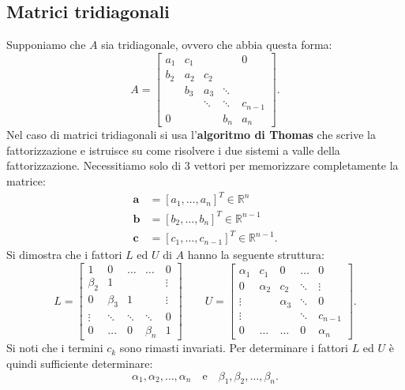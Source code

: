 \subsection{Matrici tridiagonali}

Supponiamo che $\displaystyle A$ sia tridiagonale, ovvero che abbia questa forma:
\begin{equation*}
    A=
    \begin{bmatrix}
        a_{1} & c_{1} &        &        & 0       \\
        b_{2} & a_{2} & c_{2}  &        &         \\
              & b_{3} & a_{3}  & \ddots &         \\
              &       & \ddots & \ddots & c_{n-1} \\
        0     &       &        & b_{n}  & a_{n}
    \end{bmatrix}.
\end{equation*}
Nel caso di matrici tridiagonali si usa l'\textbf{algoritmo di Thomas} che scrive la fattorizzazione e istruisce su come risolvere i due sistemi a valle della fattorizzazione.
Necessitiamo solo di $3$ vettori per memorizzare completamente la matrice:
\begin{align*}
\mathbf{a} & =[ a_{1} ,\dotsc ,a_{n}]^{T} \in \mathbb{R}^{n}\\
\mathbf{b} & =[ b_{2} ,\dotsc ,b_{n}]^{T} \in \mathbb{R}^{n-1}\\
\mathbf{c} & =[ c_{1} ,\dotsc ,c_{n-1}]^{T} \in \mathbb{R}^{n-1}.
\end{align*}
Si dimostra che i fattori $\displaystyle L$ ed $U$ di $\displaystyle A$ hanno la seguente struttura:
\begin{equation*}
L=\begin{bmatrix}
1 & 0 & \dotsc  & \dotsc  & 0\\
\beta _{2} & 1 &  &  & \vdots \\
0 & \beta _{3} & 1 &  & \vdots \\
\vdots  & \ddots  & \ddots  & \ddots  & 0\\
0 & \dotsc  & 0 & \beta _{n} & 1
\end{bmatrix} \qquad U=\begin{bmatrix}
\alpha _{1} & c_{1} & 0 & \dotsc  & 0\\
0 & \alpha _{2} & c_{2} & \ddots  & \vdots \\
\vdots  &  & \alpha _{3} & \ddots  & 0\\
\vdots  &  &  & \ddots  & c_{n-1}\\
0 & \dotsc  & \dotsc  & 0 & \alpha _{n}
\end{bmatrix}.
\end{equation*}
Si noti che i termini $c_{k}$ sono rimasti invariati.
Per determinare i fattori $\displaystyle L$ ed $U$ è quindi sufficiente determinare:
\begin{equation*}
\alpha _{1} ,\alpha _{2} ,\dotsc ,\alpha _{n} \quad \text{e} \quad \beta _{1} ,\beta _{2} ,\dotsc ,\beta _{n}.
\end{equation*}


